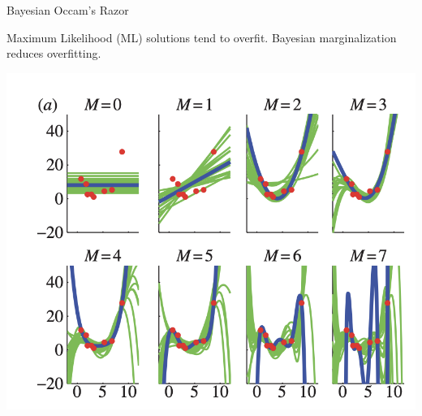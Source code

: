 \documentclass[10pt]{beamer}
\begin{document}
\begin{frame}{Bayesian Occam's Razor}
\scriptsize

Maximum Likelihood (ML)  solutions tend to overfit.  Bayesian marginalization reduces overfitting.


\begin{minipage}[t]{.47\textwidth}
\begin{center}
\includegraphics[width=.7\textwidth]{images/occams_razor_a}
\end{center}


\end{minipage}
\end{frame}
\end{document}
